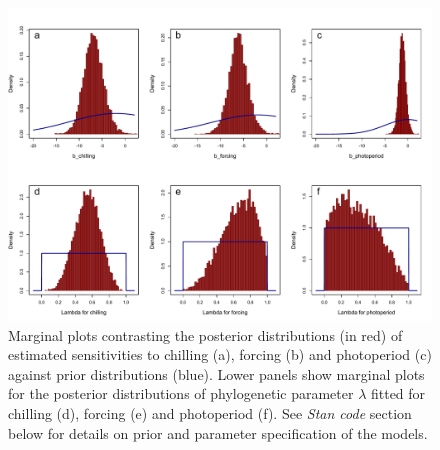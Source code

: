 \documentclass[11pt]{article}
\begin{document}
\clearpage
\begin{figure}
  \begin{center}
  \includegraphics[width=14cm]{../../analyses/phylogeny/figures/FigSXX_marginal_plots_betas_lambda.pdf}
  \caption{Marginal plots contrasting the posterior distributions (in red) of estimated sensitivities to chilling (a), forcing (b) and photoperiod (c) against prior distributions (blue). Lower panels show marginal plots for the posterior distributions of phylogenetic parameter $\lambda$ fitted for chilling (d), forcing (e) and photoperiod (f). See \emph{Stan code} section below for details on prior and parameter specification of the models.}
  \label{fig:marginalplots}
  \end{center}
\end{figure}
\end{document}

